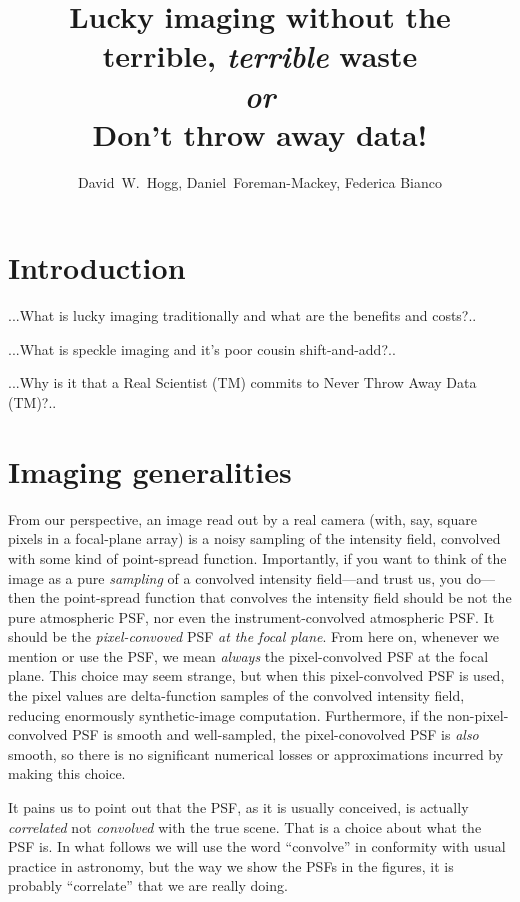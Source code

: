 \documentclass[12pt,preprint]{aastex}
\title{Lucky imaging without the terrible, \emph{terrible} waste\\
       \textit{or}\\
       Don't throw away data!}
\author{
  David~W.~Hogg\altaffilmark{\ref{CCPP},\ref{MPIA},\ref{email}},
  Daniel~Foreman-Mackey\altaffilmark{\ref{CCPP}},
  Federica Bianco\altaffilmark{\ref{CCPP},\ref{LCOGT}}
}
\begin{document}
\section{Introduction}

...What is lucky imaging traditionally and what are the benefits and costs?..

...What is speckle imaging and it's poor cousin shift-and-add?..

...Why is it that a Real Scientist (TM) commits to Never Throw Away Data (TM)?..

\section{Imaging generalities}

From our perspective, an image read out by a real camera (with, say,
square pixels in a focal-plane array) is a noisy sampling of the
intensity field, convolved with some kind of point-spread function.
Importantly, if you want to think of the image as a pure
\emph{sampling} of a convolved intensity field---and trust us, you
do---then the point-spread function that convolves the intensity field
should be not the pure atmospheric PSF, nor even the
instrument-convolved atmospheric PSF.  It should be the
\emph{pixel-convoved} PSF \emph{at the focal plane}.  From here on,
whenever we mention or use the PSF, we mean \emph{always} the
pixel-convolved PSF at the focal plane.  This choice may seem strange,
but when this pixel-convolved PSF is used, the pixel values are
delta-function samples of the convolved intensity field, reducing
enormously synthetic-image computation.  Furthermore, if the
non-pixel-convolved PSF is smooth and well-sampled, the
pixel-conovolved PSF is \emph{also} smooth, so there is no significant
numerical losses or approximations incurred by making this choice.

It pains us to point out that the PSF, as it is usually conceived, is
actually \emph{correlated} not \emph{convolved} with the true scene.
That is a choice about what the PSF is.  In what follows we will use
the word ``convolve'' in conformity with usual practice in astronomy,
but the way we show the PSFs in the figures, it is probably
``correlate'' that we are really doing.
\end{document}
